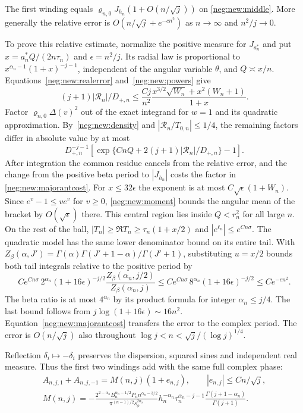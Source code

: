 \documentclass[11pt]{article}
\numberwithin{equation}{section}
\theoremstyle{definition}
\begin{document}
The first winding equals $\varrho_{n,0}J_{h_n}(1+O(n/\sqrt j))$
on \eqref{neg:new:middle}. More generally the relative error is
$O(n/\sqrt j+e^{-c n^2})$ as $n\to\infty$ and $n^2/j\to0$.

To prove this relative estimate, normalize the positive measure for
$J_{a_n^*}$ and put
$x=a_n^*Q/(2n\tau_n)$ and $\epsilon=n^2/j$.
Its radial law is proportional to $x^{\alpha_n-1}(1+x)^{-j-1}$,
independent of the angular variable $\theta$, and $Q\asymp x/n$.
Equations~\eqref{neg:new:realerror} and~\eqref{neg:new:powers} give
\[
 (j+1)|\mathcal R_n|/D_{+,n}\le
 \frac{Cj}{n^2}\frac{x^{3/2}\sqrt{W_n}+x^2(W_n+1)}{1+x}.
\]
Factor $\varrho_{n,0}\Delta(v)^2$ out of the exact integrand for
$w=1$ and its quadratic approximation. By~\eqref{neg:new:density} and
$|\mathcal R_n/T_{0,n}|\le1/4$, the remaining factors differ in
absolute value by at most
\begin{equation}
 D_{+,n}^{-j-1}\left[
 \exp\{CnQ+2(j+1)|\mathcal R_n|/D_{+,n}\}-1\right].          \label{neg:new:integranderror}
\end{equation}
After integration the common residue cancels from the relative error,
and the change from the positive beta period to $|J_{h_n}|$ costs
the factor in \eqref{neg:new:majorantcost}.
For $x\le32\epsilon$ the exponent is at most
$C\sqrt\epsilon(1+W_n)$. Since $e^v-1\le v e^v$ for $v\ge0$,
\eqref{neg:new:moment} bounds the angular mean of the bracket by
$O(\sqrt\epsilon)$ there. This central region lies inside $Q<r_n^2$
for all large $n$. On the rest of the ball,
$|T_n|\ge\Re T_n\ge\tau_n(1+x/2)$ and $|e^{\ell_n}|\le e^{Cn\sigma}$.
The quadratic model has the same lower denominator bound on its
entire tail. With $Z_\beta(\alpha,J')=\Gamma(\alpha)
\Gamma(J'+1-\alpha)/\Gamma(J'+1)$, substituting $u=x/2$ bounds both
tail integrals relative to the positive period by
\[
 C e^{Cn\sigma}\,2^{\alpha_n}(1+16\epsilon)^{-j/2}
       \frac{Z_\beta(\alpha_n,j/2)}{Z_\beta(\alpha_n,j)}
 \le C e^{Cn\sigma}\,8^{\alpha_n}(1+16\epsilon)^{-j/2}
 \le C e^{-c n^2}.
\]
The beta ratio is at most $4^{\alpha_n}$ by its product formula for
integer $\alpha_n\le j/4$. The last bound follows from
$j\log(1+16\epsilon)\sim16n^2$. Equation~\eqref{neg:new:majorantcost}
transfers the error to the complex period. The error is $O(n/\sqrt j)$
also throughout $\log j<n<\sqrt j/(\log j)^{1/4}$.

Reflection $\delta_i\mapsto-\delta_i$ preserves the dispersion,
squared sines and independent real measure.  Thus the first two
windings add with the same full complex phase:
\begin{gather}
 A_{n,j,1}+A_{n,j,-1}=M(n,j)(1+e_{n,j}),\qquad
 |e_{n,j}|\le Cn/\sqrt j,\label{neg:new:modelerror}\\
 M(n,j)=-\frac{2^{2-\alpha_n}B_n^{\alpha_n-1/2}P_n
                          n^{\alpha_n-3/2}}
        {\pi^{(n-1)/2}s_\phi^{2\alpha_n}}
 h_n^{-\alpha_n}\tau_n^{\alpha_n-j-1}
                \frac{\Gamma(j+1-\alpha_n)}{\Gamma(j+1)}.
                                                        \label{neg:new:model}
\end{gather}
\end{document}
